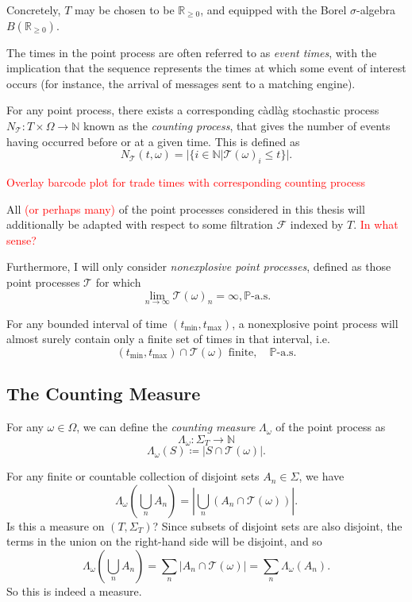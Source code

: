 \documentclass[honours,12pt]{unswthesis}
\numberwithin{equation}{section}
\begin{document}
Concretely, $T$ may be chosen to be $\mathbb{R}_{\geq 0}$, and equipped with the Borel $\sigma$-algebra $B\left(\mathbb{R}_{\geq 0}\right)$.

The times in the point process are often referred to as \textit{event times}, with the implication that the sequence represents the times at which some event of interest occurs (for instance, the arrival of messages sent to a matching engine).

{\noindent}For any point process, there exists a corresponding càdlàg stochastic process $N_{\mathcal T}:T\times\Omega\to\mathbb{N}$ known as the \textit{counting process}, that gives the number of events having occurred before or at a given time. This is defined as
$$N_{\mathcal T}(t,\omega) = \vert \{i\in\mathbb N \vert \mathcal{T}(\omega)_i \leq t\} \vert.$$

\textcolor{red}{Overlay barcode plot for trade times with corresponding counting process}

All \textcolor{red}{(or perhaps many)} of the point processes considered in this thesis will additionally be adapted with respect to some filtration $\mathcal F$ indexed by $T$. \textcolor{red}{In what sense?}

Furthermore, I will only consider \textit{nonexplosive point processes}, defined as those point processes $\mathcal{T}$ for which
$$\lim_{n\to\infty}\mathcal{T}(\omega)_n=\infty, \mathbb{P}\text{-a.s.}$$

For any bounded interval of time $(t_{\min},t_{\max})$, a nonexplosive point process will almost surely contain only a finite set of times in that interval, i.e.
$$(t_{\min},t_{\max}) \cap \mathcal{T}(\omega) \text{ finite},\quad\mathbb{P}\text{-a.s.}$$

\subsection{The Counting Measure}
For any $\omega\in\Omega$, we can define the \textit{counting measure} $\Lambda_\omega$ of the point process as
$$\Lambda_\omega : \Sigma_T \to \mathbb{N}$$
$$\Lambda_\omega(S) \coloneq \left\vert S\cap \mathcal{T}(\omega)\right\vert.$$

For any finite or countable collection of disjoint sets $A_n\in\Sigma$, we have
$$\Lambda_\omega\left(\bigcup_n A_n\right) = \left\vert \bigcup_n \left(A_n\cap\mathcal{T}(\omega)\right)\right\vert.$$
Is this a measure on $(T,\Sigma_T)$? Since subsets of disjoint sets are also disjoint, the terms in the union on the right-hand side will be disjoint, and so
$$\Lambda_\omega\left(\bigcup_n A_n\right) = \sum_n\left\vert A_n\cap \mathcal{T}(\omega)\right\vert = \sum_n \Lambda_\omega(A_n).$$
So this is indeed a measure.
\end{document}
